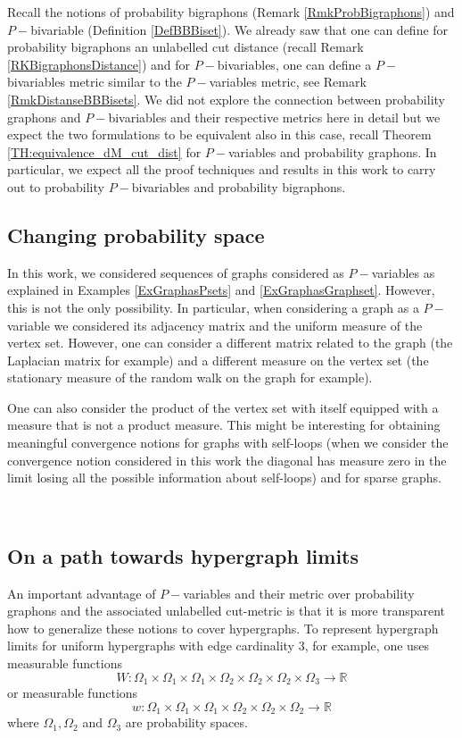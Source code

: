 \documentclass[11pt]{article}
\def\R{\mathbb{R}}
\begin{document}
Recall the notions of probability bigraphons (Remark \ref{RmkProbBigraphons}) and $P-$bivariable (Definition \ref{DefBBBiset}). We already saw that one can define for probability bigraphons an unlabelled cut distance (recall Remark \ref{RKBigraphonsDistance}) and for $P-$bivariables, one can define a $P-$bivariables metric similar to the $P-$variables metric, see Remark \ref{RmkDistanseBBBisets}. We did not explore the connection between probability graphons and $P-$bivariables and their respective metrics here in detail but we expect the two formulations to be equivalent also in this case, recall Theorem \ref{TH:equivalence_dM_cut_dist} for $P-$variables and probability graphons. In particular, we expect all the proof techniques and results in this work to carry out to probability $P-$bivariables and probability bigraphons.


\subsection{Changing probability space}

In this work, we considered sequences of graphs considered as $P-$variables as explained in Examples \ref{ExGraphasPsets} and \ref{ExGraphasGraphset}. However, this is not the only possibility. In particular, when considering a graph as a $P-$variable we considered its adjacency matrix and the uniform measure of the vertex set. However, one can consider a different matrix related to the graph (the Laplacian matrix for example) and a different measure on the vertex set (the stationary measure of the random walk on the graph for example).

One can also consider the product of the vertex set with itself equipped with a measure that is not a product measure. This might be interesting for obtaining meaningful convergence notions for graphs with self-loops (when we consider the convergence notion considered in this work the diagonal has measure zero in the limit losing all the possible information about self-loops) and for sparse graphs.      

\

\subsection{On a path towards hypergraph limits}

An important advantage of $P-$variables and their metric over probability graphons and the associated unlabelled cut-metric is that it is more transparent how to generalize these notions to cover hypergraphs. To represent hypergraph limits for uniform hypergraphs with edge cardinality $3$, for example, one uses measurable functions $$
W:\Omega_1\times \Omega_1 \times \Omega_1 \times \Omega_2\times \Omega_2 \times \Omega_2 \times \Omega_3 \rightarrow \R
$$
or measurable functions
$$
w:\Omega_1\times \Omega_1 \times \Omega_1 \times \Omega_2\times \Omega_2 \times \Omega_2  \rightarrow \R
$$
where $\Omega_1,\Omega_2 $ and $\Omega_3$ are probability spaces.
\end{document}
